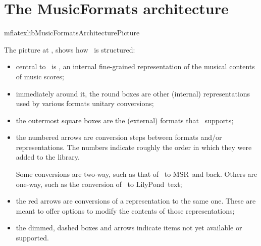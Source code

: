 



\chapter{The MusicFormats architecture}\label{The MusicFormats architecture}

{mflatexlibMusicFormatsArchitecturePicture}

The picture at , shows how \mf\ is structured:
\begin{itemize}
\item central to \mf\ is \msrRepr, an internal fine-grained representation of the musical contents of music scores;

\item immediately around it, the round boxes are other (internal) representations used by various formats unitary conversions;

\item the outermost square boxes are the (external) formats that \mf\ supports;

\item the numbered arrows are conversion steps between formats and/or representations. The numbers indicate roughly the order in which they were added to the library.

Some conversions are two-way, such as that of \mxsrRepr\ to MSR\ and back. Others are one-way, such as the conversion of \lpsrRepr\ to LilyPond\ text;

\item the red arrows are conversions of a representation to the same one. These are meant to offer options to modify the contents of those representations;

\item the dimmed, dashed boxes and arrows indicate items not yet available or supported.

\end{itemize}

